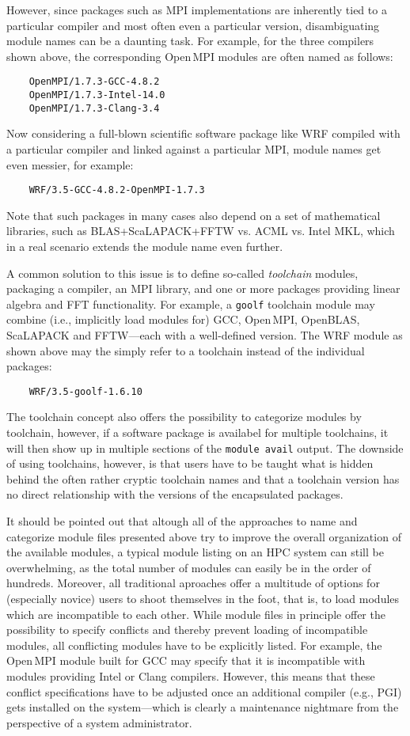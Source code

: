 However, since packages such as MPI implementations are inherently tied to a
particular compiler and most often even a particular version, disambiguating
module names can be a daunting task. For example, for the three compilers
shown above, the corresponding Open\,MPI modules are often named as follows:
\begin{verbatim}
    OpenMPI/1.7.3-GCC-4.8.2
    OpenMPI/1.7.3-Intel-14.0
    OpenMPI/1.7.3-Clang-3.4
\end{verbatim}

Now considering a full-blown scientific software package like WRF compiled
with a particular compiler and linked against a particular MPI, module names
get even messier, for example:
\begin{verbatim}
    WRF/3.5-GCC-4.8.2-OpenMPI-1.7.3
\end{verbatim}
Note that such packages in many cases also depend on a set of mathematical
libraries, such as BLAS+ScaLAPACK+FFTW vs. ACML vs. Intel MKL, which in a
real scenario extends the module name even further.

A common solution to this issue is to define so-called \emph{toolchain}
modules, packaging a compiler, an MPI library, and one or more packages
providing linear algebra and FFT functionality. For example, a \texttt{goolf}
toolchain module may combine (i.e., implicitly load modules for) GCC,
Open\,MPI, OpenBLAS, ScaLAPACK and FFTW---each with a well-defined version. The
WRF module as shown above may the simply refer to a toolchain instead of the
individual packages:
\begin{verbatim}
    WRF/3.5-goolf-1.6.10
\end{verbatim}
The toolchain concept also offers the possibility to categorize modules by
toolchain, however, if a software package is availabel for multiple
toolchains, it will then show up in multiple sections of the \texttt{module
avail} output. The downside of using toolchains, however, is that users have
to be taught what is hidden behind the often rather cryptic toolchain names
and that a toolchain version has no direct relationship with the versions of
the encapsulated packages.

It should be pointed out that altough all of the approaches to name and
categorize module files presented above try to improve the overall
organization of the available modules, a typical module listing on an HPC
system can still be overwhelming, as the total number of modules can easily
be in the order of hundreds. Moreover, all traditional aproaches offer a
multitude of options for (especially novice) users to shoot themselves in the
foot, that is, to load modules which are incompatible to each other. While
module files in principle offer the possibility to specify conflicts and
thereby prevent loading of incompatible modules, all conflicting modules have
to be explicitly listed. For example, the Open\,MPI module built for GCC may
specify that it is incompatible with modules providing Intel or Clang
compilers. However, this means that these conflict specifications have to be
adjusted once an additional compiler (e.g., PGI) gets installed on the
system---which is clearly a maintenance nightmare from the perspective of a
system administrator.

